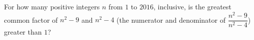 For how many positive integers $n$ from $1$ to $2016$, inclusive, is the greatest common factor of $n^2-9$ and $n^2-4$ (the numerator and denominator of $\dfrac{n^2-9}{n^2-4}$) greater than $1$?
